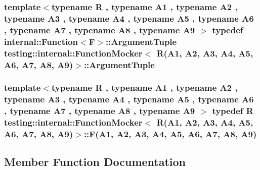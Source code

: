 \subsubsection[{\texorpdfstring{Argument\+Tuple}{ArgumentTuple}}]{\setlength{\rightskip}{0pt plus 5cm}template$<$typename R , typename A1 , typename A2 , typename A3 , typename A4 , typename A5 , typename A6 , typename A7 , typename A8 , typename A9 $>$ typedef {\bf internal\+::\+Function}$<${\bf F}$>$\+::{\bf Argument\+Tuple} {\bf testing\+::internal\+::\+Function\+Mocker}$<$ R(A1, A2, A3, A4, A5, A6, A7, A8, A9)$>$\+::{\bf Argument\+Tuple}}\hypertarget{classtesting_1_1internal_1_1FunctionMocker_3_01R_07A1_00_01A2_00_01A3_00_01A4_00_01A5_00_01A6_00_01A7_00_01A8_00_01A9_08_4_afcb802dfc6e26a318bd0599846bff218}{}\label{classtesting_1_1internal_1_1FunctionMocker_3_01R_07A1_00_01A2_00_01A3_00_01A4_00_01A5_00_01A6_00_01A7_00_01A8_00_01A9_08_4_afcb802dfc6e26a318bd0599846bff218}
\subsubsection[{\texorpdfstring{F}{F}}]{\setlength{\rightskip}{0pt plus 5cm}template$<$typename R , typename A1 , typename A2 , typename A3 , typename A4 , typename A5 , typename A6 , typename A7 , typename A8 , typename A9 $>$ typedef R {\bf testing\+::internal\+::\+Function\+Mocker}$<$ R(A1, A2, A3, A4, A5, A6, A7, A8, A9)$>$\+::F(A1, A2, A3, A4, A5, A6, A7, A8, A9)}\hypertarget{classtesting_1_1internal_1_1FunctionMocker_3_01R_07A1_00_01A2_00_01A3_00_01A4_00_01A5_00_01A6_00_01A7_00_01A8_00_01A9_08_4_a8de64ec5559bd4e4410a4374e9c93e4e}{}\label{classtesting_1_1internal_1_1FunctionMocker_3_01R_07A1_00_01A2_00_01A3_00_01A4_00_01A5_00_01A6_00_01A7_00_01A8_00_01A9_08_4_a8de64ec5559bd4e4410a4374e9c93e4e}


\subsection{Member Function Documentation}
